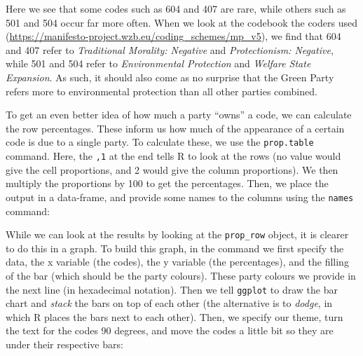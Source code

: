 \documentclass[
]{book}
\newenvironment{Shaded}{\begin{snugshade}}{\end{snugshade}}
\newcommand{\DecValTok}[1]{\textcolor[rgb]{0.00,0.00,0.81}{#1}}
\newcommand{\FunctionTok}[1]{\textcolor[rgb]{0.00,0.00,0.00}{#1}}
\newcommand{\NormalTok}[1]{#1}
\newcommand{\OtherTok}[1]{\textcolor[rgb]{0.56,0.35,0.01}{#1}}
\newcommand{\SpecialCharTok}[1]{\textcolor[rgb]{0.00,0.00,0.00}{#1}}
\newcommand{\StringTok}[1]{\textcolor[rgb]{0.31,0.60,0.02}{#1}}
\begin{document}
Here we see that some codes such as 604 and 407 are rare, while others such as 501 and 504 occur far more often. When we look at the codebook the coders used (\url{https://manifesto-project.wzb.eu/coding_schemes/mp_v5}), we find that 604 and 407 refer to \emph{Traditional Morality: Negative} and \emph{Protectionism: Negative}, while 501 and 504 refer to \emph{Environmental Protection} and \emph{Welfare State Expansion}. As such, it should also come as no surprise that the Green Party refers more to environmental protection than all other parties combined.

To get an even better idea of how much a party ``owns'' a code, we can calculate the row percentages. These inform us how much of the appearance of a certain code is due to a single party. To calculate these, we use the \texttt{prop.table} command. Here, the \texttt{,1} at the end tells R to look at the rows (no value would give the cell proportions, and 2 would give the column proportions). We then multiply the proportions by 100 to get the percentages. Then, we place the output in a data-frame, and provide some names to the columns using the \texttt{names} command:

\begin{Shaded}
\end{Shaded}

While we can look at the results by looking at the \texttt{prop\_row} object, it is clearer to do this in a graph. To build this graph, in the command we first specify the data, the x variable (the codes), the y variable (the percentages), and the filling of the bar (which should be the party colours). These party colours we provide in the next line (in hexadecimal notation). Then we tell \texttt{ggplot} to draw the bar chart and \emph{stack} the bars on top of each other (the alternative is to \emph{dodge}, in which R places the bars next to each other). Then, we specify our theme, turn the text for the codes 90 degrees, and move the codes a little bit so they are under their respective bars:
\end{document}
